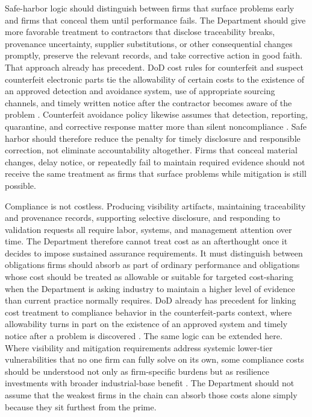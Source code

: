 Safe-harbor logic should distinguish between firms that surface problems early and firms that conceal them until performance fails. The Department should give more favorable treatment to contractors that disclose traceability breaks, provenance uncertainty, supplier substitutions, or other consequential changes promptly, preserve the relevant records, and take corrective action in good faith. That approach already has precedent. DoD cost rules for counterfeit and suspect counterfeit electronic parts tie the allowability of certain costs to the existence of an approved detection and avoidance system, use of appropriate sourcing channels, and timely written notice after the contractor becomes aware of the problem \parencite{ch5_dfars23120571}. Counterfeit avoidance policy likewise assumes that detection, reporting, quarantine, and corrective response matter more than silent noncompliance \parencite{ch5_dfars2522467007}. Safe harbor should therefore reduce the penalty for timely disclosure and responsible correction, not eliminate accountability altogether. Firms that conceal material changes, delay notice, or repeatedly fail to maintain required evidence should not receive the same treatment as firms that surface problems while mitigation is still possible.

Compliance is not costless. Producing visibility artifacts, maintaining traceability and provenance records, supporting selective disclosure, and responding to validation requests all require labor, systems, and management attention over time. The Department therefore cannot treat cost as an afterthought once it decides to impose sustained assurance requirements. It must distinguish between obligations firms should absorb as part of ordinary performance and obligations whose cost should be treated as allowable or suitable for targeted cost-sharing when the Department is asking industry to maintain a higher level of evidence than current practice normally requires. DoD already has precedent for linking cost treatment to compliance behavior in the counterfeit-parts context, where allowability turns in part on the existence of an approved system and timely notice after a problem is discovered \parencite{ch5_dfars23120571}. The same logic can be extended here. Where visibility and mitigation requirements address systemic lower-tier vulnerabilities that no one firm can fully solve on its own, some compliance costs should be understood not only as firm-specific burdens but as resilience investments with broader industrial-base benefit \parencite{ch5_dod2022_supplychains,ch5_nist800161r1upd1}. The Department should not assume that the weakest firms in the chain can absorb those costs alone simply because they sit furthest from the prime.

